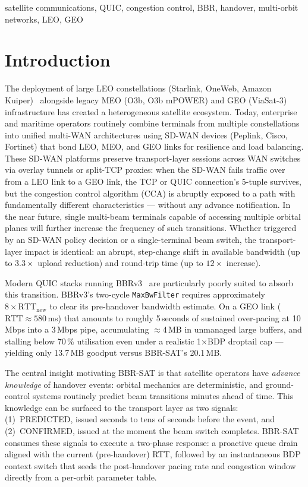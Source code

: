 \documentclass[conference]{IEEEtran}
\begin{document}
\begin{IEEEkeywords}
satellite communications, QUIC, congestion control, BBR, handover,
multi-orbit networks, LEO, GEO
\end{IEEEkeywords}

\section{Introduction}
\label{sec:intro}

The deployment of large LEO constellations (Starlink, OneWeb, Amazon
Kuiper)~\cite{handley2018delay,bhattacherjee2019}
alongside legacy MEO (O3b, O3b mPOWER) and GEO (ViaSat-3) infrastructure
has created a heterogeneous satellite ecosystem.
Today, enterprise and maritime operators routinely combine terminals from
multiple constellations into unified multi-WAN architectures using SD-WAN
devices (Peplink, Cisco, Fortinet) that bond LEO, MEO, and GEO links for
resilience and load balancing.
These SD-WAN platforms preserve transport-layer sessions across WAN switches
via overlay tunnels or split-TCP proxies: when the SD-WAN fails traffic over
from a LEO link to a GEO link, the TCP or QUIC connection's 5-tuple survives,
but the congestion control algorithm (CCA) is abruptly exposed to a path with
fundamentally different characteristics --- without any advance notification.
In the near future, single multi-beam terminals capable of accessing multiple
orbital planes will further increase the frequency of such transitions.
Whether triggered by an SD-WAN policy decision or a single-terminal beam
switch, the transport-layer impact is identical: an abrupt, step-change shift
in available bandwidth (up to $3.3\times$ upload reduction) and round-trip
time (up to $12\times$ increase).

Modern QUIC stacks running BBRv3~\cite{cardwell2026bbr} are particularly
poorly suited to absorb this transition.
BBRv3's two-cycle \texttt{MaxBwFilter} requires approximately
$8 \times \mathrm{RTT}_\mathrm{new}$ to clear its pre-handover bandwidth
estimate.
On a GEO link ($\mathrm{RTT} \approx 580$\,ms) that amounts to roughly
5\,seconds of sustained over-pacing at 10\,Mbps into a 3\,Mbps pipe,
accumulating $\approx$4\,MB in unmanaged large buffers,
and stalling below 70\,\% utilisation even under a realistic 1$\times$BDP
droptail cap --- yielding only 13.7\,MB goodput versus BBR-SAT's 20.1\,MB.

The central insight motivating BBR-SAT is that satellite operators have
\emph{advance knowledge} of handover events: orbital mechanics are
deterministic, and ground-control systems routinely predict beam transitions
minutes ahead of time.
This knowledge can be surfaced to the transport layer as two signals:
(1)~PREDICTED, issued seconds to tens of seconds before the event, and
(2)~CONFIRMED, issued at the moment the beam switch completes.
BBR-SAT consumes these signals to execute a two-phase response:
a proactive queue drain aligned with the current (pre-handover) RTT,
followed by an instantaneous BDP context switch that seeds the post-handover
pacing rate and congestion window directly from a per-orbit parameter table.
\end{document}
